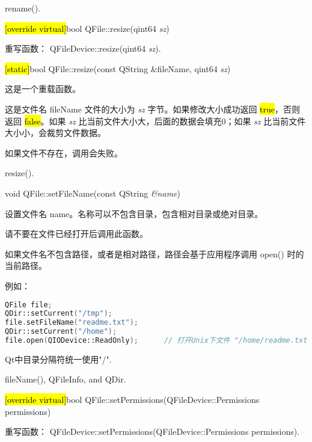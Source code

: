 \begin{seeAlso}
rename().
\end{seeAlso}

\hl{[override virtual]}bool QFile::resize(qint64 \emph{sz})

重写函数： QFileDevice::resize(qint64 \emph{sz}).

\hl{[static]}bool QFile::resize(const QString \&fileName, qint64 \emph{sz})

这是一个重载函数。

这是文件名 fileName 文件的大小为 \emph{sz} 字节。如果修改大小成功返回 \hl{true}，否则返回 \hl{false}。如果 \emph{sz} 比当前文件大小大，后面的数据会填充0；如果 \emph{sz} 比当前文件大小小，会裁剪文件数据。



\begin{warning}
如果文件不存在，调用会失败。
\end{warning}

\begin{seeAlso}
resize().
\end{seeAlso}

void QFile::setFileName(const QString \emph{\&name})

设置文件名 name。名称可以不包含目录，包含相对目录或绝对目录。

请不要在文件已经打开后调用此函数。

如果文件名不包含路径，或者是相对路径，路径会基于应用程序调用 open() 时的当前路径。

例如：

\begin{lstlisting}[language=C++]
QFile file;
QDir::setCurrent("/tmp");
file.setFileName("readme.txt");
QDir::setCurrent("/home");
file.open(QIODevice::ReadOnly);      // 打开Unix下文件 "/home/readme.txt"
\end{lstlisting}



\begin{notice}
Qt中目录分隔符统一使用"/".
\end{notice}

\begin{seeAlso}
fileName(), QFileInfo, and QDir.
\end{seeAlso}

\splitLine

\hl{[override virtual]}bool QFile::setPermissions(QFileDevice::Permissions permissions)

重写函数： QFileDevice::setPermissions(QFileDevice::Permissions permissions).

